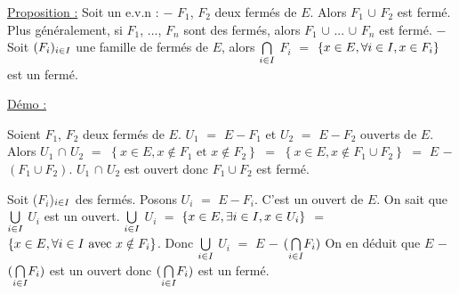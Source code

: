 \documentclass{article}
\begin{document}
\parindent=0cm \smallbreak
\underline{Proposition :} Soit \evn un e.v.n :\parindent=1cm \smallbreak 
$-$ $F_1$, $F_2$ deux fermés de $E$. Alors $F_1$ $\cup$ $F_2$ est fermé. Plus généralement, si $F_1$, ..., $F_n$ sont des fermés, \smallbreak alors $F_1$ $\cup$ ... $\cup$ $F_n$ est fermé.
\smallbreak 
$-$ Soit $(F_i)_{i \in I}$ une famille de fermés de $E$, alors
$\underset{i \in I}{\bigcap}$ $F_i$ $=$ $\left\{ x \in E, \forall i \in I, x \in F_i \right\}$ est un fermé.

\parindent=0cm \smallbreak
\underline{Démo :}\parindent=1cm \smallbreak
\begin{minipage}{0.6\linewidth}
    Soient $F_1$, $F_2$ deux fermés de $E$. $U_1$ $=$ $E - F_1$ et $U_2$ $=$ $E - F_2$ ouverts de $E$.
    \smallbreak
    Alors $U_1$ $\cap$ $U_2$ $=$ $\left\{ x \in E, x \notin F_1\text{ et }x \notin F_2 \right\}$ $=$ $\left\{ x \in E, x \notin F_1 \cup F_2 \right\}$ $=$ $E$ $-$ $(F_1 \cup F_2)$.
    $U_1$ $\cap$ $U_2$ est ouvert donc $F_1 \cup F_2$ est fermé.
\end{minipage}\begin{minipage}{0.3\linewidth}
    \hspace{0.2cm}
\end{minipage}
\smallbreak
Soit ($F_i$)$_{i \in I}$ des fermés. Posons $U_i$ $=$ $E - F_i$. C'est un ouvert de $E$. On sait que $\underset{i \in I}{\bigcup}$ $U_i$ est un ouvert.  
\smallbreak
$\underset{i \in I}{\bigcup}$ $U_i$ $=$ $\left\{ x \in E, \exists i \in I, x \in U_i \right\}$ $=$ $\left\{ x \in E, \forall i \in I\text{ avec }x \notin F_i \right\}$.
Donc $\underset{i \in I}{\bigcup}$ $U_i$ $=$ $E$ $-$ $( \underset{i \in I}{\bigcap} F_i )$
On en déduit \smallbreak que $E$ $-$ $(\underset{i \in I}{\bigcap} F_i)$ est un ouvert donc $(\underset{i \in I}{\bigcap} F_i)$ est un fermé.
\end{document}
